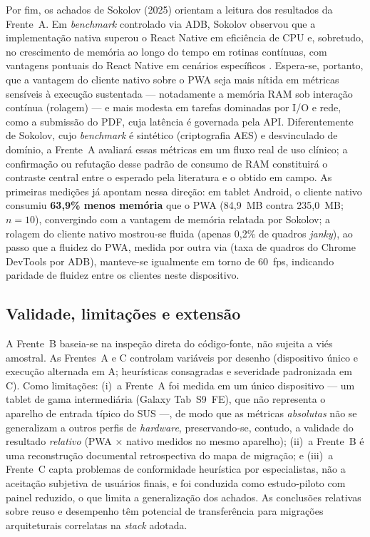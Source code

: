 \documentclass[12pt]{article}
\begin{document}
Por fim, os achados de Sokolov (2025) orientam a leitura dos resultados da Frente~A. Em \emph{benchmark} controlado via ADB, Sokolov observou que a
implementação nativa superou o React Native em eficiência de CPU e, sobretudo, no
crescimento de memória ao longo do tempo em rotinas contínuas, com vantagens
pontuais do React Native em cenários específicos \cite{sokolov2025}. Espera-se,
portanto, que a vantagem do cliente nativo sobre o PWA seja mais nítida em métricas
sensíveis à execução sustentada --- notadamente a memória RAM sob interação
contínua (rolagem) --- e mais modesta em tarefas dominadas por I/O e rede, como a
submissão do PDF, cuja latência é governada pela API. Diferentemente de Sokolov,
cujo \emph{benchmark} é sintético (criptografia AES) e desvinculado de domínio, a
Frente~A avaliará essas métricas em um fluxo real de uso clínico; a confirmação ou
refutação desse padrão de consumo de RAM constituirá o contraste central entre o
esperado pela literatura e o obtido em campo. As primeiras medições já apontam
nessa direção: em tablet Android, o cliente nativo consumiu \textbf{63,9\% menos
memória} que o PWA (84,9~MB contra 235,0~MB; $n=10$), convergindo com a vantagem
de memória relatada por Sokolov; a rolagem do cliente nativo mostrou-se fluida (apenas 0,2\% de quadros
\emph{janky}), ao passo que a fluidez do PWA, medida por outra via (taxa de quadros
do Chrome DevTools por ADB), manteve-se igualmente em torno de 60~fps, indicando
paridade de fluidez entre os clientes neste dispositivo.

\subsection{Validade, limitações e extensão}
\label{sub:validade}

A Frente~B baseia-se na inspeção direta do código-fonte, não sujeita a viés
amostral. As Frentes~A e C controlam variáveis por desenho (dispositivo único e
execução alternada em A; heurísticas consagradas e severidade padronizada em C).
Como limitações: (i)~a Frente~A foi medida em um único dispositivo --- um tablet
de gama intermediária (Galaxy Tab~S9~FE), que não representa o aparelho de entrada
típico do SUS ---, de modo que as métricas \emph{absolutas} não se generalizam a
outros perfis de \emph{hardware}, preservando-se, contudo, a validade do resultado
\emph{relativo} (PWA $\times$ nativo medidos no mesmo aparelho); (ii)~a Frente~B é uma reconstrução documental
retrospectiva do mapa de migração; e (iii)~a Frente~C capta problemas de
conformidade heurística por especialistas, não a aceitação subjetiva de usuários
finais, e foi conduzida como estudo-piloto com painel reduzido, o que limita a generalização dos achados. As conclusões relativas sobre
reuso e desempenho têm potencial de transferência para migrações arquiteturais
correlatas na \emph{stack} adotada.



\end{document}
